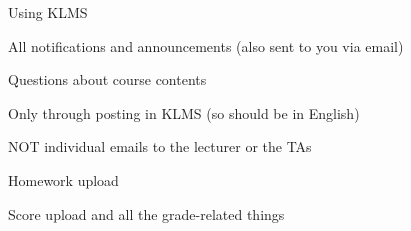 










\begin{frame}{Using KLMS}

  \plitemsep 0.1in
  \bci

  \item<1-> All notifications and announcements (also sent to you via email)

  \item<2-> Questions about course contents

    \bci

  \item Only through posting in KLMS (so should be in English)
    \item NOT individual emails to the lecturer or the TAs
    \eci

  \item<3-> Homework upload
    \item<4-> Score upload and all the grade-related things

    \eci



\end{frame}

